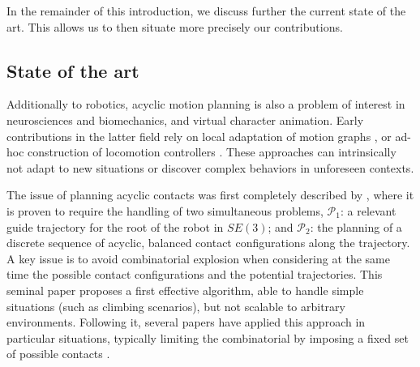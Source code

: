 In the remainder of this introduction, we discuss further the current state of the art. This allows us to then situate more precisely our contributions.

\subsection{State of the art}

\newcommand{\Pa}{$\mathcal{P}_1$ }
\newcommand{\Pb}{$\mathcal{P}_2$ }

Additionally to robotics, acyclic motion planning is also a problem of interest in neurosciences and biomechanics, and virtual character animation.
Early contributions in the latter field rely on local adaptation of motion graphs \citep{citeulike:220163}, or ad-hoc construction of locomotion controllers \citep{Pettre:2003:LPD:846276.846313}. These approaches can intrinsically not adapt to new situations or discover complex behaviors in unforeseen contexts.

The issue of planning acyclic contacts was first completely described by \citeauthor{conf/iser/BretlRLKA04}, where  it is proven to require the handling of two simultaneous problems, $\mathcal{P}_1$: a relevant guide trajectory for the root of the robot in $SE(3)$; and $\mathcal{P}_2$: the planning of a discrete sequence of acyclic, balanced contact configurations along the trajectory.  A key issue is to avoid combinatorial explosion when considering at the same time the possible contact configurations and the potential trajectories. This seminal paper proposes a first effective algorithm, able to handle simple situations (such as climbing scenarios), but not scalable to arbitrary environments. Following it, seve\-ral papers have applied this approach in particular situations, typically limiting the combinatorial by imposing a fixed set of possible contacts \citep{Hauser06usingmotion, stilman2010}.

